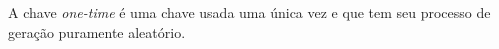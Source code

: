 \documentclass{article}
\begin{document}
A chave \textit{one-time} é uma chave usada uma única vez e que tem seu
processo de geração puramente aleatório.

\end{document}
